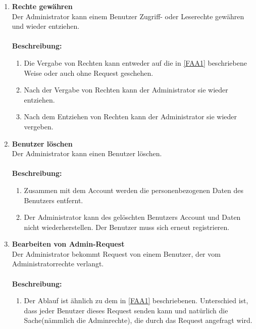 \documentclass[parskip=full,11pt]{scrartcl}
\def\threedigits#1{%
  \ifnum#1<10 0\fi
  \ifnum#1<1 0\fi
  \number#1}
\begin{document}
\begin{enumerate}[label={\textbf{/F\protect\threedigits{\theenumi}0/}}, leftmargin=*, resume]
\newpage
\item \label{FAA3} \textbf{Rechte gewähren}\\ Der Administrator kann einem Benutzer Zugriff- oder Leserechte gewähren und wieder entziehen.\\\\
\textbf{Beschreibung:}\\
\begin{enumerate}[label=(\arabic*), leftmargin=*]
	\item Die Vergabe von Rechten kann entweder auf die in \ref{FAA1} beschriebene Weise oder auch ohne Request geschehen.\\
	\item Nach der Vergabe von Rechten kann der Administrator sie wieder entziehen. \\ 
	\item Nach dem Entziehen von Rechten kann der Administrator sie wieder vergeben. \\
	\end{enumerate}

\item \label{FAA4} \textbf{Benutzer löschen}\\ Der Administrator kann einen Benutzer löschen. \\\\
\textbf{Beschreibung:}\\
\begin{enumerate}[label=(\arabic*), leftmargin=*]
	\item Zusammen mit dem Account werden die personenbezogenen Daten des Benutzers entfernt.\\
	\item Der Administrator kann des gelöschten Benutzers Account und Daten nicht wiederherstellen. Der Benutzer muss sich erneut registrieren. \\ 
	\end{enumerate}

\item \label{FAA5} \colorbox{shadecolor} {\textbf{Bearbeiten von Admin-Request}}\\ Der Administrator bekommt Request von einem Benutzer, der vom Administratorrechte verlangt.\\\\
\textbf{Beschreibung:}\\
\begin{enumerate}[label=(\arabic*), leftmargin=*]
	\item Der Ablauf ist ähnlich zu dem in \ref{FAA1} beschriebenen. Unterschied ist, dass jeder Benutzer dieses Request senden kann und natürlich die Sache(nämmlich die Adminrechte), die durch das Request angefragt wird.\\
	\end{enumerate}




\end{enumerate}
\end{document}
